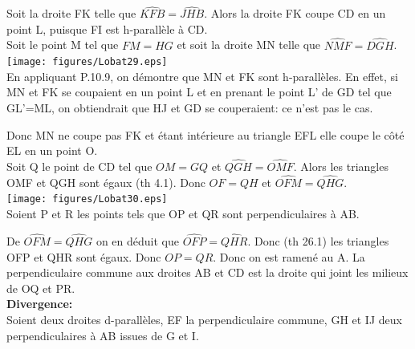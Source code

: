 \documentclass[a4paper, 12pt, twoside]{book}
\begin{document}
  Soit la droite FK telle que $\hat{KFB}=\hat{JHB}$. Alors la droite FK coupe CD en un point L, puisque FI est h-parallèle à CD.\\
  
  Soit le point M tel que $FM=HG$ et soit la droite MN telle que $\hat{NMF}=\hat{DGH}$. \\
  
        
     
    \texttt{[image: figures/Lobat29.eps]}\\    
      
    
   En appliquant P.10.9, on démontre que MN et FK sont h-parallèles. En effet, si MN et FK se coupaient en un point L et en prenant le point L' de GD tel que GL'=ML, on obtiendrait que HJ et GD se couperaient: ce n'est pas le cas.\
   
   Donc MN ne coupe pas FK et étant intérieure au triangle EFL elle coupe le côté EL en un point O.\\
   
 Soit Q le point de CD tel que $OM=GQ$ et $\hat{QGH}=\hat{OMF}$. Alors les triangles OMF et QGH sont égaux (th 4.1). Donc $OF=QH$ et $\hat{OFM}=\hat{QHG}$.\\
 
    
  
   \texttt{[image: figures/Lobat30.eps]}\\ 
   
   Soient P et R les points tels que OP et QR sont perpendiculaires à AB.\
   
   De   $\hat{OFM}=\hat{QHG}$ on en déduit que $\hat{OFP}=\hat{QHR}$. Donc (th 26.1) les triangles OFP et QHR sont égaux. Donc $OP=QR$. Donc on est ramené au A. La perpendiculaire commune aux droites AB et CD est la droite qui joint les milieux de OQ et PR.\\
   
   \textbf{Divergence:}\\
   
   Soient deux droites d-parallèles, EF la perpendiculaire commune, GH et IJ deux perpendiculaires à AB issues de G et I.\\
   
\end{document}
